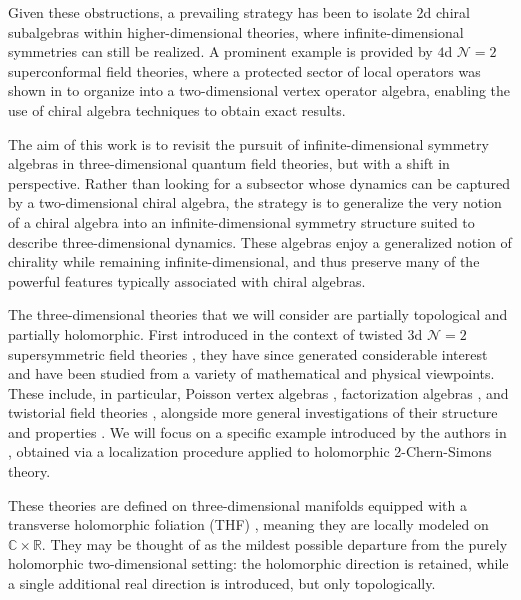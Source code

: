 \documentclass[11pt]{amsart}
\newcommand{\R}{{\mathbb R}}
\newcommand{\C}{{\mathbb C}}
\numberwithin{equation}{section}
\numberwithin{figure}{section}
\numberwithin{table}{section}
\theoremstyle{thm}
\numberwithin{equation}{subsection}
\theoremstyle{definition}
\theoremstyle{rem}
\begin{document}
Given these obstructions, a prevailing strategy has been to isolate 2d chiral subalgebras within higher-dimensional theories, where infinite-dimensional symmetries can still be realized. A prominent example is provided by $4$d \(\mathcal{N}=2\) superconformal field theories, where a protected sector of local operators was shown in \cite{Beem:2013sza} to organize into a two-dimensional vertex operator algebra, enabling the use of chiral algebra techniques to obtain exact results. 

The aim of this work is to revisit the pursuit of infinite-dimensional symmetry algebras in three-dimensional quantum field theories, but with a shift in perspective. Rather than looking for a subsector whose dynamics can be captured by a two-dimensional chiral algebra, the strategy is to generalize the very notion of a chiral algebra into an infinite-dimensional symmetry structure suited to describe three-dimensional dynamics. These algebras enjoy a generalized notion of chirality while remaining infinite-dimensional, and thus preserve many of the powerful features typically associated with chiral algebras.


The three-dimensional theories that we will consider are partially topological and partially holomorphic. First introduced in the context of twisted 3d $\mathcal{N}=2$ supersymmetric field theories \cite{Aganagic:2017tvx}, they have since generated considerable interest and have been studied from a variety of mathematical and physical viewpoints. These include, in particular, Poisson vertex algebras \cite{Oh:2019mcg, Zeng:2021zef, Khan:2025rah}, factorization algebras \cite{Wang:2024tjf}, and twistorial field theories \cite{Garner:2023izn}, alongside more general investigations of their structure and properties \cite{Beem:2018fng,Costello:2020ndc, Gwilliam:2021zkv, Garner:2023wrc, Garner:2023zko, Dimofte:2025oqf, Budzik:2025zvu}.
We will focus on a specific example introduced by the authors in \cite{Chen:2024axr}, obtained via a localization procedure applied to holomorphic 2-Chern-Simons theory. 

These theories are defined on three-dimensional manifolds equipped with a transverse holomorphic foliation (THF) \cite{Duchamp:1979, Rawnsley}, meaning they are locally modeled on 
$\C\times \R$. They may be thought of as the mildest possible departure from the purely holomorphic two-dimensional setting: the holomorphic direction is retained, while a single additional real direction is introduced, but only topologically.
\end{document}
